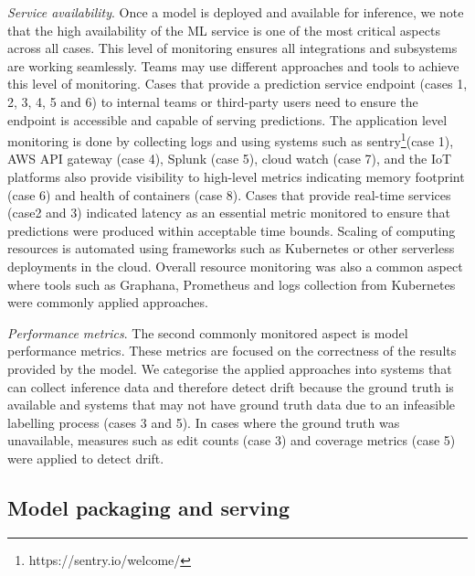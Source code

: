 \textit{Service availability}. Once a model is deployed and available for inference, we note that the high availability of the ML service is one of the most critical aspects across all cases. This level of monitoring ensures all integrations and subsystems are working seamlessly. Teams may use different approaches and tools to achieve this level of monitoring. Cases that provide a prediction service endpoint (cases 1, 2, 3, 4, 5 and 6) to internal teams or third-party users need to ensure the endpoint is accessible and capable of serving predictions. The application level monitoring is done by collecting logs and using systems such as sentry\footnote{https://sentry.io/welcome/}(case 1), AWS API gateway (case 4), Splunk (case 5), cloud watch (case 7), and the IoT platforms also provide visibility to high-level metrics indicating memory footprint (case 6) and health of containers (case 8).
Cases that provide real-time services (case2 and 3) indicated latency as an essential metric monitored to ensure that predictions were produced within acceptable time bounds. Scaling of computing resources is automated using frameworks such as Kubernetes or other serverless deployments in the cloud.  Overall resource monitoring was also a common aspect where tools such as Graphana, Prometheus and logs collection from Kubernetes were commonly applied approaches.

\textit{Performance metrics}. The second commonly monitored aspect is model performance metrics. These metrics are focused on the correctness of the results provided by the model. We categorise the applied approaches into systems that can collect inference data and therefore detect drift because the ground truth is available and systems that may not have ground truth data due to an infeasible labelling process (cases 3 and 5). In cases where the ground truth was unavailable, measures such as edit counts (case 3) and coverage metrics (case 5) were applied to detect drift. %


\subsection{Model packaging and serving
}

